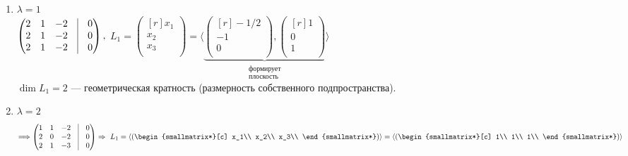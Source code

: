 \begin{enumerate}
	\item{
		$\lambda =1   $ \\ 
		$
		\begin{pmatrix*}[r]
		2 & 1 & -2 & \vrule & 0\\
		2 & 1 & -2 & \vrule & 0\\
		2 & 1 & -2 & \vrule & 0\\
		\end{pmatrix*} ,
		$
		$
		L_1=
		\left(
		\begin{smallmatrix*}[r]
		x_1\\ x_2\\ x_3\\ 
		\end{smallmatrix*}
		\right) 
		=
		\langle
		\underbrace{
			\left(
			\begin{smallmatrix*}[r] %
			-1/2\\ -1\\ 0\\ 
			\end{smallmatrix*}
			\right) ,
			\left(
			\begin{smallmatrix*}[r]
			1\\ 0\\ 1\\ 
			\end{smallmatrix*}
			\right) 
		}_{\substack{\text{формирует}\\\text{плоскость}}}
		\rangle
		$\\
		$ \dim L_1=2$ --- геометрическая кратность (размерность собственного подпространства). %
	}
	\item $\lambda = 2$ $$\Longrightarrow
	\begin{pmatrix}
	1 & 1 & -2 & \vrule & 0\\
	2 & 0 & -2 & \vrule & 0\\
	2 & 1 & -3 & \vrule & 0\\
	\end{pmatrix}
	\Rightarrow
	~L_1 = 
	\langle
	\left(
	\begin{smallmatrix*}[c]
	x_1\\ x_2\\ x_3\\ 
	\end{smallmatrix*}
	\right) 
	\rangle=
	\langle
	\left(
	\begin{smallmatrix*}[c]
	1\\ 1\\ 1\\ 
	\end{smallmatrix*}
	\right) 
	\rangle $$
\end{enumerate}
